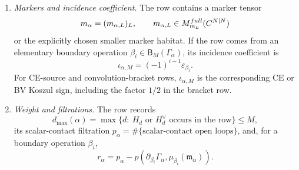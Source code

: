 \begin{defn}
\begin{enumerate}[label=(A\arabic*)]
    \item \emph{Markers and incidence coefficient.}  The row contains a
    marker tensor
    \[
      m_\alpha=(m_{\alpha,L})_L,\qquad
      m_{\alpha,L}\in M^{full}_{m_L}(C^{N|N})
    \]
    or the explicitly chosen smaller marker habitat.  If the row comes from
    an elementary boundary operation
    \(\beta_i\in\mathsf B_M(\Gamma_\alpha)\), its incidence coefficient is
    \[
      \iota_{\alpha,M}=(-1)^{i-1}\varepsilon_{\beta_i}.
    \]
    For CE-source and convolution-bracket rows, \(\iota_{\alpha,M}\) is the
    corresponding CE or BV Koszul sign, including the factor \(1/2\) in the
    bracket row.

    \item \emph{Weight and filtrations.}  The row records
    \[
      d_{\max}(\alpha)=
      \max\{d:\ H_d\text{ or }H_d^\vee\text{ occurs in the row}\}\leq M,
    \]
    its scalar-contact filtration
    \(p_\alpha=\#\{\text{scalar-contact open loops}\}\), and, for a boundary
    operation \(\beta_i\),
    \[
      r_\alpha=p_\alpha-
      p(\partial_{\beta_i}\Gamma_\alpha,\mu_{\beta_i}(\mathfrak m_\alpha)).
    \]


\end{enumerate}
\end{defn}
